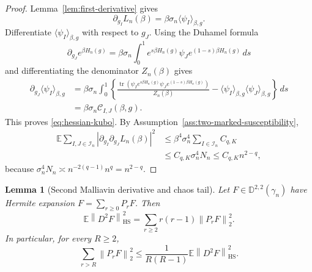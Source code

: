 \documentclass[11pt]{article}
\newtheorem{lemma}[theorem]{Lemma}
\newcommand{\E}{\mathbb{E}}
\newcommand{\tr}{\operatorname{tr}}
\newcommand{\calI}{\mathcal{I}}
\newcommand{\dd}{\,d}
\newcommand{\norm}[1]{\left\lVert #1\right\rVert}
\newcommand{\HS}{\mathrm{HS}}
\begin{document}
\begin{proof}
  Lemma~\ref{lem:first-derivative} gives
  \begin{equation}\label{eq:first-derivative-before-kubo}
    \partial_{g_I}L_n(\beta)
    =
    \beta\sigma_n\langle\psi_I\rangle_{\beta,g}.
  \end{equation}
  Differentiate $\langle\psi_I\rangle_{\beta,g}$ with respect to $g_J$.
  Using the Duhamel formula
  \begin{equation}\label{eq:duhamel-kubo}
    \partial_{g_J}e^{\beta H_n(g)}
    =
    \beta\sigma_n
    \int_0^1
      e^{s\beta H_n(g)}\psi_J e^{(1-s)\beta H_n(g)}
    \dd s
  \end{equation}
  and differentiating the denominator $Z_n(\beta)$ gives
  \begin{align}\label{eq:derivative-thermal-average}
    \partial_{g_J}\langle\psi_I\rangle_{\beta,g}
    &=
    \beta\sigma_n
    \int_0^1
    \left\{
      \frac{
        \tr\left(\psi_I e^{s\beta H_n(g)}
        \psi_J e^{(1-s)\beta H_n(g)}\right)
      }{Z_n(\beta)}
      -
      \langle\psi_I\rangle_{\beta,g}
      \langle\psi_J\rangle_{\beta,g}
    \right\}
    \dd s \\
    &=
    \beta\sigma_n\mathcal C_{I,J}(\beta,g).
  \end{align}
  This proves \eqref{eq:hessian-kubo}.  By
  Assumption~\ref{ass:two-marked-susceptibility},
  \begin{align}\label{eq:hessian-hs-bound-proof}
    \E
    \sum_{I,J\in\calI_n}
    \left|
      \partial_{g_I}\partial_{g_J}L_n(\beta)
    \right|^2
    &\leq
    \beta^4\sigma_n^4
    \sum_{I\in\calI_n}
    C_{q,K} \\
    &\leq
    C_{q,K}\sigma_n^4N_n
    \leq
    C_{q,K}n^{2-q},
  \end{align}
  because $\sigma_n^4N_n\asymp n^{-2(q-1)}n^q=n^{2-q}$.
\end{proof}

\begin{lemma}[Second Malliavin derivative and chaos tail]
  \label{lem:malliavin-second-tail}
  Let $F\in\mathbb D^{2,2}(\gamma_n)$ have Hermite expansion
  $F=\sum_{r\geq0}P_rF$.  Then
  \begin{equation}\label{eq:second-malliavin-chaos}
    \E\norm{D^2F}_{\HS}^2
    =
    \sum_{r\geq2}r(r-1)\norm{P_rF}_2^2.
  \end{equation}
  In particular, for every $R\geq2$,
  \begin{equation}\label{eq:tail-from-hessian}
    \sum_{r>R}\norm{P_rF}_2^2
    \leq
    \frac{1}{R(R-1)}
    \E\norm{D^2F}_{\HS}^2.
  \end{equation}
\end{lemma}
\end{document}
